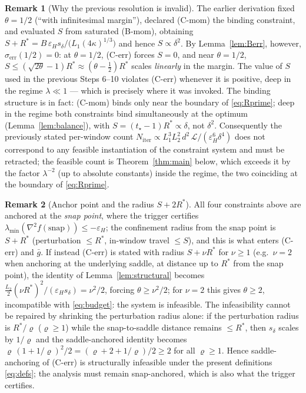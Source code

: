 \documentclass[11pt,a4paper]{article}
\theoremstyle{plain}
\theoremstyle{definition}
\newtheorem{remark}{Remark}
\newcommand{\eps}{\varepsilon}
\newcommand{\epsH}{\eps_{H}}
\newcommand{\sdel}{s_{\delta}}
\newcommand{\LL}{\mathcal{L}}
\newcommand{\Rstar}{R^{*}}
\newcommand{\gup}{\bar g}
\newcommand{\Niter}{N_{\mathrm{iter}}}
\newcommand{\serr}{\sigma_{\mathrm{err}}}
\newcommand{\tstar}{t_\star}
\begin{document}
\begin{remark}[Why the previous resolution is invalid]\label{rem:previous}
The earlier derivation fixed $\theta = 1/2$ (``with infinitesimal margin''),
declared (C-mom) the binding constraint, and evaluated $S$ from saturated
(B-mom), obtaining $S + \Rstar = B\,\epsH\sdel/\big(L_1(4\kappa)^{1/3}\big)$
and hence $S \propto \delta^2$. By Lemma~\ref{lem:Berr}, however,
$\serr(1/2) = 0$: at $\theta = 1/2$, (C-err) forces $S = 0$, and near
$\theta=1/2$, $S \le (\sqrt{2\theta}-1)\Rstar \approx (\theta-\tfrac12)\Rstar$
scales \emph{linearly} in the margin. The value of $S$ used in the previous
Steps 6--10 violates (C-err) whenever it is positive, deep in the regime
$\lambda \ll 1$ --- which is precisely where it was invoked. The binding
structure is in fact: (C-mom) binds only near the boundary of
\eqref{eq:Rprime}; deep in the regime both constraints bind simultaneously at
the optimum (Lemma~\ref{lem:balance}), with $S = (\tstar-1)\Rstar \propto
\delta$, not $\delta^2$. Consequently the previously stated per-window count
$\Niter \propto L_1^3 L_2^2\,d^2\,\LL/(\epsH^6\delta^4)$ does not correspond
to any feasible instantiation of the constraint system and must be
retracted; the feasible count is Theorem~\ref{thm:main} below, which exceeds
it by the factor $\lambda^{-2}$ (up to absolute constants) inside the
regime, the two coinciding at the boundary of \eqref{eq:Rprime}.
\end{remark}

\begin{remark}[Anchor point and the radius $S+2\Rstar$]\label{rem:anchor}
All four constraints above are anchored at the \emph{snap point}, where the
trigger certifies $\lambda_{\min}(\nabla^2 f(\mathrm{snap})) \le -\epsH$;
the confinement radius from the snap point is $S + \Rstar$ (perturbation
$\le \Rstar$, in-window travel $\le S$), and this is what enters (C-err) and
$\gup$. If instead (C-err) is stated with radius $S + \nu\Rstar$ for
$\nu \ge 1$ (e.g.\ $\nu = 2$ when anchoring at the underlying saddle, at
distance up to $\Rstar$ from the snap point), the identity of
Lemma~\ref{lem:structural} becomes
$\tfrac{L_2}{2}(\nu\Rstar)^2/(\epsH\sdel) = \nu^2/2$, forcing
$\theta \ge \nu^2/2$; for $\nu = 2$ this gives $\theta \ge 2$, incompatible
with \eqref{eq:budget}: the system is infeasible. The infeasibility cannot
be repaired by shrinking the perturbation radius alone: if the perturbation
radius is $\Rstar/\varrho$ ($\varrho \ge 1$) while the snap-to-saddle
distance remains $\le \Rstar$, then $\sdel$ scales by $1/\varrho$ and the
saddle-anchored identity becomes
$\varrho\,(1+1/\varrho)^2/2 = (\varrho + 2 + 1/\varrho)/2 \ge 2$ for all
$\varrho \ge 1$. Hence saddle-anchoring of (C-err) is structurally
infeasible under the present definitions \eqref{eq:defs}; the analysis must
remain snap-anchored, which is also what the trigger certifies.
\end{remark}
\end{document}
